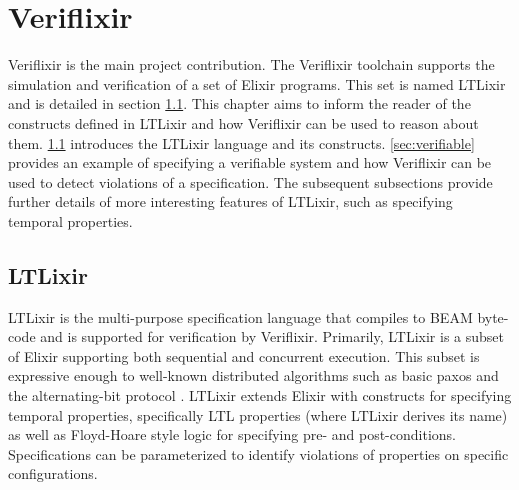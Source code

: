 \chapter{Veriflixir}
Veriflixir is the main project contribution. The Veriflixir toolchain supports the simulation and verification of a set of Elixir programs. This set is named LTLixir and is detailed in section \ref{sec:ltlixir}. This chapter aims to inform the reader of the constructs defined in LTLixir and how Veriflixir can be used to reason about them. \ref{sec:ltlixir} introduces the LTLixir language and its constructs. \ref{sec:verifiable} provides an example of specifying a verifiable system and how Veriflixir can be used to detect violations of a specification. The subsequent subsections provide further details of more interesting features of LTLixir, such as specifying temporal properties.
\section{LTLixir} \label{sec:ltlixir}
LTLixir is the multi-purpose specification language that compiles to BEAM byte-code and is supported for verification by Veriflixir. Primarily, LTLixir is a subset of Elixir supporting both sequential and concurrent execution. This subset is expressive enough to well-known distributed algorithms such as basic paxos \cite{basic-paxos} and the alternating-bit protocol \cite{ab-protocol}. LTLixir extends Elixir with constructs for specifying temporal properties, specifically LTL properties (where LTLixir derives its name) as well as Floyd-Hoare style logic for specifying pre- and post-conditions. Specifications can be parameterized to identify violations of properties on specific configurations. 
\par

